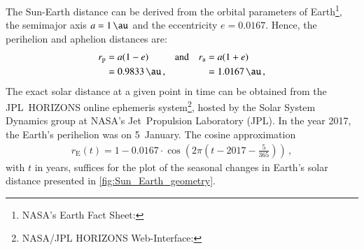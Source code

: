 The Sun-Earth distance can be derived from the orbital parameters of Earth\footnote{NASA's Earth Fact Sheet: }, the semimajor axis $a = \SI{1}{\au}$ and the eccentricity $e = \num{0.0167}$. Hence, the perihelion and aphelion distances are:
\begin{align*}
	r_\text{p} &= a (1 - e)	&	&\text{and}	&	r_\text{a} &= a (1 + e)\\
		&= \SI{0.9833}{\au}	\,,	&	&	&	&= \SI{1.0167}{\au}	\,,
\end{align*}
The exact solar distance at a given point in time can be obtained from the JPL~HORIZONS online ephemeris system\footnote{NASA/JPL HORIZONS Web-Interface: }, hosted by the Solar System Dynamics group at NASA's Jet~Propulsion Laboratory (JPL). In the year 2017, the Earth's perihelion was on 5~January.
The cosine approximation
\begin{align}
	r_\text{E}(t) = 1 - 0.0167 \cdot \cos\left(2 \pi \left(t - 2017 - \frac{5}{365}\right)\right)\,,
\end{align}
with $t$ in years, suffices for the plot of the seasonal changes in Earth's solar distance presented in \autoref{fig:Sun_Earth_geometry}.
\begin{figure}[htb]
\end{figure}
